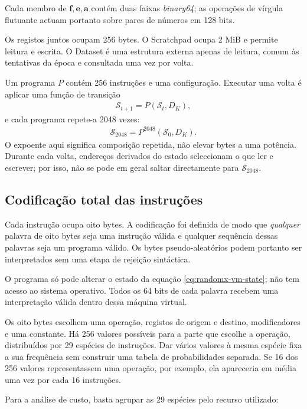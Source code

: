 Cada membro de \(\mathbf f,\mathbf e,\mathbf a\) contém duas faixas
\emph{binary64}; as operações de vírgula flutuante actuam portanto sobre pares
de números em 128 bits.

Os registos juntos ocupam 256 bytes. O Scratchpad ocupa 2 MiB e permite leitura
e escrita. O Dataset é uma estrutura externa apenas de leitura, comum às
tentativas da época e consultada uma vez por volta.

Um programa \(P\) contém 256 instruções e uma configuração. Executar uma
volta é aplicar uma função de transição
\begin{align*}
 \mathcal S_{t+1}=P(\mathcal S_t,D_K),
\end{align*}
e cada programa repete-a 2048 vezes:
\begin{align}
 \mathcal S_{2048}=P^{2048}(\mathcal S_0,D_K).
 \label{eq:randomx-program-iterations}
\end{align}
O expoente aqui significa composição repetida, não elevar bytes a uma
potência. Durante cada volta, endereços derivados do estado seleccionam o que
ler e escrever; por isso, não se pode em geral saltar directamente para
\(\mathcal S_{2048}\).

\subsection{Codificação total das instruções}

Cada instrução ocupa oito bytes. A codificação foi definida de modo que
\emph{qualquer} palavra de oito bytes seja uma instrução válida e qualquer
sequência dessas palavras seja um programa válido. Os bytes pseudo-aleatórios
podem portanto ser interpretados sem uma etapa de rejeição sintáctica.

O programa só pode alterar o estado da equação
\eqref{eq:randomx-vm-state}; não tem acesso ao sistema operativo. Todos os 64
bits de cada palavra recebem uma interpretação válida dentro dessa máquina
virtual.

Os oito bytes escolhem uma operação, registos de origem e destino,
modificadores e uma constante. Há 256 valores possíveis para a parte que
escolhe a operação, distribuídos por 29 espécies de instruções. Dar vários
valores à mesma espécie fixa a sua frequência sem construir uma tabela de
probabilidades separada. Se 16 dos 256 valores representassem uma operação,
por exemplo, ela apareceria em média uma vez por cada 16 instruções.

Para a análise de custo, basta agrupar as 29 espécies pelo recurso utilizado:

